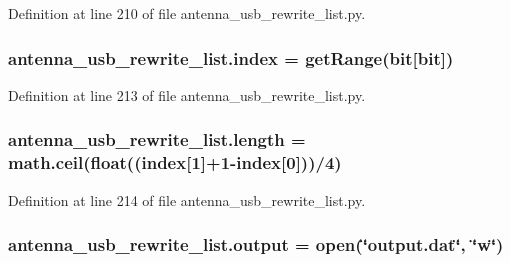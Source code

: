 Definition at line 210 of file antenna\+\_\+usb\+\_\+rewrite\+\_\+list.\+py.

\subsubsection[{\texorpdfstring{index}{index}}]{\setlength{\rightskip}{0pt plus 5cm}antenna\+\_\+usb\+\_\+rewrite\+\_\+list.\+index = {\bf get\+Range}(bit\mbox{[}\textquotesingle{}bit\textquotesingle{}\mbox{]})}\hypertarget{namespaceantenna__usb__rewrite__list_af12533542e50af5ea554054416933a61}{}\label{namespaceantenna__usb__rewrite__list_af12533542e50af5ea554054416933a61}


Definition at line 213 of file antenna\+\_\+usb\+\_\+rewrite\+\_\+list.\+py.

\subsubsection[{\texorpdfstring{length}{length}}]{\setlength{\rightskip}{0pt plus 5cm}antenna\+\_\+usb\+\_\+rewrite\+\_\+list.\+length = math.\+ceil(float(({\bf index}\mbox{[}1\mbox{]}+1-\/{\bf index}\mbox{[}0\mbox{]}))/4)}\hypertarget{namespaceantenna__usb__rewrite__list_a7db7584b8616ae6b6bbb5720a302001a}{}\label{namespaceantenna__usb__rewrite__list_a7db7584b8616ae6b6bbb5720a302001a}


Definition at line 214 of file antenna\+\_\+usb\+\_\+rewrite\+\_\+list.\+py.

\subsubsection[{\texorpdfstring{output}{output}}]{\setlength{\rightskip}{0pt plus 5cm}antenna\+\_\+usb\+\_\+rewrite\+\_\+list.\+output = open(\char`\"{}output.\+dat\char`\"{}, \char`\"{}w\char`\"{})}\hypertarget{namespaceantenna__usb__rewrite__list_aa1b615265707138d427863eb19fd9ecb}{}\label{namespaceantenna__usb__rewrite__list_aa1b615265707138d427863eb19fd9ecb}



